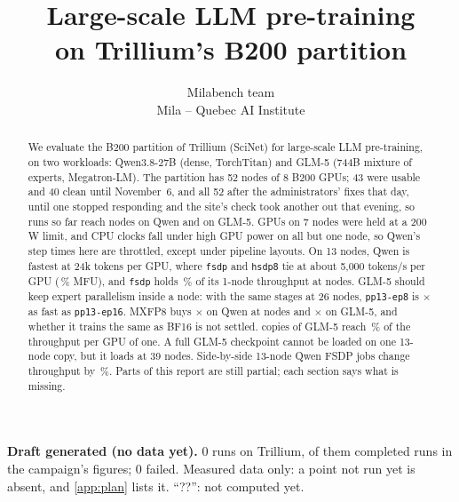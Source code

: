 \documentclass{article}
\title{Large-scale LLM pre-training\\ on Trillium's B200 partition}
\author{%
  Milabench team \\
  Mila -- Quebec AI Institute \\
}
\providecommand{\DataGenerated}{(no data yet)}
\providecommand{\NRunsReal}{0}
\providecommand{\NRunsFailed}{0}
\providecommand{\TriFailedNote}{}
\begin{document}
\maketitle

\begin{abstract}
  We evaluate the B200 partition of Trillium (SciNet) for large-scale LLM pre-training, on two workloads: Qwen3.8-27B (dense, TorchTitan) and GLM-5 (744B mixture of experts, Megatron-LM). The partition has 52 nodes of 8 B200 GPUs; 43 were usable and 40 clean until November~6, and all 52 after the administrators' fixes that day, until one stopped responding and the site's check took another out that evening, so runs so far reach \TriQwenTop{} nodes on Qwen and \TriGlmTop{} on GLM-5.
  GPUs on 7 nodes were held at a 200\,W limit, and CPU clocks fall under high GPU power on all but one node, so Qwen's step times here are throttled, except under pipeline layouts.
  On 13 nodes, Qwen is fastest at 24k tokens per GPU, where \texttt{fsdp} and \texttt{hsdp8} tie at about 5,000 tokens/s per GPU (\TriQwenBestMFU\,\% MFU), and \texttt{fsdp} holds \TriWeakFEffOne\,\% of its 1-node throughput at \TriWeakFTop{} nodes. GLM-5 should keep expert parallelism inside a node: with the same stages at 26 nodes, \texttt{pp13-ep8} is $\times$\TriGlmEpTwoSixRatio{} as fast as \texttt{pp13-ep16}. MXFP8 buys $\times$\TriQwenFpTop{} on Qwen at \TriQwenFpTopNodes{} nodes and $\times$\TriGlmFpMxTop{} on GLM-5, and whether it trains the same as BF16 is not settled. \TriGlmCopiesTop{} copies of GLM-5 reach \TriGlmCopiesEff\,\% of the throughput per GPU of one. A full GLM-5 checkpoint cannot be loaded on one 13-node copy, but it loads at 39 nodes. Side-by-side 13-node Qwen FSDP jobs change throughput by \TriInterferencePct\,\%. Parts of this report are still partial; each section says what is missing.
\end{abstract}

\begin{tcolorbox}[colback=red!4, colframe=red!50!black, boxrule=0.4pt, arc=0pt, fontupper=\small]
  \textbf{Draft generated \DataGenerated.} \NRunsReal{} runs on Trillium, \TriRunsInReport{} of them completed runs in the campaign's figures; \NRunsFailed{} failed. Measured data only: a point not run yet is absent, and \cref{app:plan} lists it. ``??'': not computed yet. \TriFailedNote
\end{tcolorbox}













\appendix

\end{document}

